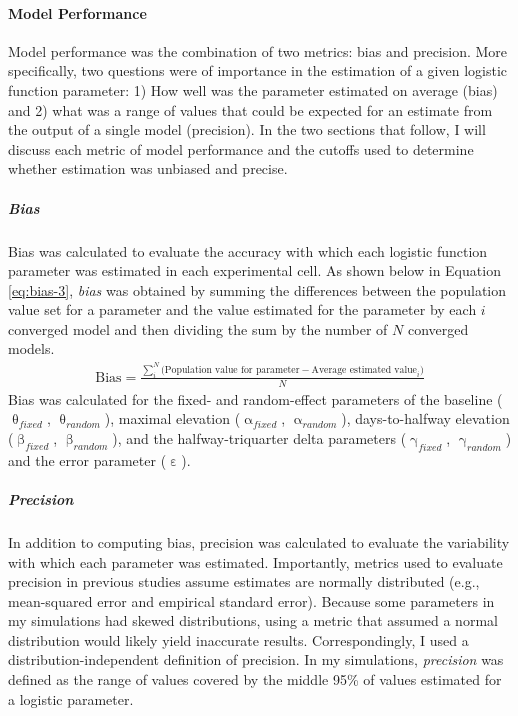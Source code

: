 \documentclass[
12pt, %
twoside,
english]{guelphthesis}
\begin{document}
\hypertarget{model-performance-2}{%
\paragraph{Model Performance}\label{model-performance-2}}

Model performance was the combination of two metrics: bias and precision. More specifically, two questions were of importance in the estimation of a given logistic function parameter: 1) How well was the parameter estimated on average (bias) and 2) what was a range of values that could be expected for an estimate from the output of a single model (precision). In the two sections that follow, I will discuss each metric of model performance and the cutoffs used to determine whether estimation was unbiased and precise.

\hypertarget{bias-1}{%
\subparagraph{Bias}\label{bias-1}}

Bias was calculated to evaluate the accuracy with which each logistic
function parameter was estimated in each experimental cell. As shown below in Equation
\eqref{eq:bias-3}, \emph{bias} was obtained by summing the differences
between the population value set for a parameter and the value estimated for the parameter by each \(i\) converged model and then dividing the sum by the number of \(N\) converged models.
\begin{align}
  \text{Bias} = \frac{\sum_i^N\text{(Population value for parameter} - \text{Average estimated value}_i)}{N}
  \label{eq:bias-3} 
\end{align}
\noindent Bias was calculated for the fixed- and random-effect parameters of the baseline (\(\uptheta_{fixed}\), \(\uptheta_{random}\)), maximal elevation (\(\upalpha_{fixed}\), \(\upalpha_{random}\)), days-to-halfway elevation (\(\upbeta_{fixed}\), \(\upbeta_{random}\)), and the halfway-triquarter delta parameters (\(\upgamma_{fixed}\), \(\upgamma_{random}\)) and the error parameter (\(\upepsilon\)).

\hypertarget{pres-precision}{%
\subparagraph{Precision}\label{pres-precision}}

In addition to computing bias, precision was calculated to evaluate the variability with which each parameter was estimated. Importantly, metrics used to evaluate precision in previous studies assume estimates are normally distributed (e.g., mean-squared error and empirical standard error). Because some parameters in my simulations had skewed distributions, using a metric that assumed a normal distribution would likely yield inaccurate results. Correspondingly, I used a distribution-independent definition of precision. In my simulations, \emph{precision} was defined as the range of values covered by the middle 95\% of values estimated for a logistic parameter.
\end{document}
